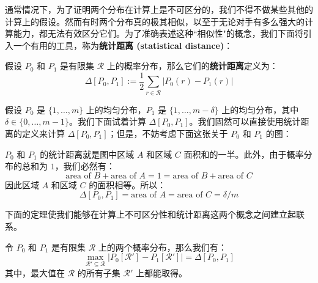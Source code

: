 通常情况下，为了证明两个分布在计算上是不可区分的，我们不得不做某些其他的计算上的假设。然而有时两个分布真的极其相似，以至于无论对手有多么强大的计算能力，都无法有效区分它们。为了准确表述这种``相似性"的概念，我们下面将引入一个有用的工具，称为\textbf{统计距离 (statistical distance)}：

\begin{definition}[统计距离]\label{def:3-5}
假设 $P_0$ 和 $P_1$ 是有限集 $\mathcal R$ 上的概率分布，那么它们的\textbf{统计距离}定义为：
\[
\Delta[P_0,P_1]:=\frac{1}{2}\sum_{r\in\mathcal{R}}\big\lvert P_0(r)-P_1(r)\big\rvert
\]
\end{definition}

\begin{example}\label{exmp:3-1}
假设 $P_0$ 是 $\{1,\dots,m\}$ 上的均匀分布，$P_1$ 是 $\{1,\dots,m-\delta\}$ 上的均匀分布，其中 $\delta\in\{0,\dots,m-1\}$。我们下面试着计算 $\Delta[P_0,P_1]$。我们固然可以直接使用统计距离的定义来计算 $\Delta[P_0,P_1]$；但是，不妨考虑下面这张关于 $P_0$ 和 $P_1$ 的图：

\begin{figure*}[h!]
  \centering
  
\end{figure*}

$P_0$ 和 $P_1$ 的统计距离就是图中区域 $A$ 和区域 $C$ 面积和的一半。此外，由于概率分布的总和为 $1$，我们必然有：
\[
\text{area of } B+ \text{area of } A= 1 = \text{area of } B+ \text{area of } C
\]
因此区域 $A$ 和区域 $C$ 的面积相等。所以：
\[
\Delta[P_0,P_1]=\text{area of } A = \text{area of } C ={\delta}/{m}
\]
\end{example}

下面的定理使我们能够在计算上不可区分性和统计距离这两个概念之间建立起联系。

\begin{theorem}\label{theo:3-10}
令 $P_0$ 和 $P_1$ 是有限集 $\mathcal R$ 上的两个概率分布，那么我们有：
\[
\max_{\mathcal{R}'\subseteq\mathcal{R}}
\big\lvert
P_0[\mathcal{R}']-P_1[\mathcal{R}']
\big\rvert
=\Delta[P_0,P_1]
\]
其中，最大值在 $\mathcal R$ 的所有子集 $\mathcal R'$ 上都能取得。
\end{theorem}

